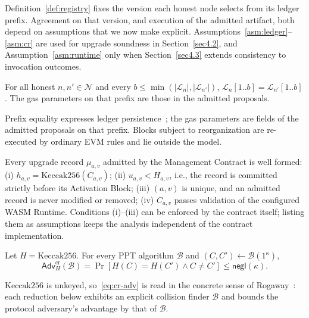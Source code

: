 \documentclass[runningheads]{llncs}
\begin{document}
Definition~\ref{def:registry} fixes the version each honest node selects from its ledger prefix. Agreement on that version, and execution of the admitted artifact, both depend on assumptions that we now make explicit. Assumptions~\ref{asm:ledger}--\ref{asm:cr} are used for upgrade soundness in Section~\ref{sec4.2}, and Assumption~\ref{asm:runtime} only when Section~\ref{sec4.3} extends consistency to invocation outcomes.

\begin{assumption}
\label{asm:ledger}
For all honest $n,n'\in\mathcal{N}$ and every $b\le\min(|\mathcal{L}_n|,|\mathcal{L}_{n'}|)$, $\mathcal{L}_n[1..b]=\mathcal{L}_{n'}[1..b]$. The gas parameters on that prefix are those in the admitted proposals.
\end{assumption}

Prefix equality expresses ledger persistence~\cite{garay2015backbone}; the gas parameters are fields of the admitted proposals on that prefix. Blocks subject to reorganization are re-executed by ordinary EVM rules and lie outside the model.

\begin{assumption}
\label{asm:registry}
Every upgrade record $\mu_{a,v}$ admitted by the Management Contract is well formed: (i) $h_{a,v}=\mathrm{Keccak256}(C_{a,v})$; (ii) $u_{a,v}<H_{a,v}$, i.e., the record is committed strictly before its Activation Block; (iii) $(a,v)$ is unique, and an admitted record is never modified or removed; (iv) $C_{a,v}$ passes validation of the configured WASM Runtime. Conditions (i)--(iii) can be enforced by the contract itself; listing them as assumptions keeps the analysis independent of the contract implementation.
\end{assumption}

\begin{assumption}
\label{asm:cr}
Let $H=\mathrm{Keccak256}$. For every PPT algorithm $\mathcal{B}$ and $(C,C')\leftarrow\mathcal{B}(1^{\kappa})$,
\begin{equation}
\mathsf{Adv}^{\mathrm{cr}}_{H}(\mathcal{B})
=\Pr[H(C)=H(C')\wedge C\neq C']
\le\mathsf{negl}(\kappa).
\label{eq:cr-adv}
\end{equation}
\end{assumption}

$\mathrm{Keccak256}$ is unkeyed, so~\eqref{eq:cr-adv} is read in the concrete sense of Rogaway~\cite{rogaway2006ignorance}: each reduction below exhibits an explicit collision finder $\mathcal{B}$ and bounds the protocol adversary's advantage by that of $\mathcal{B}$.
\end{document}
